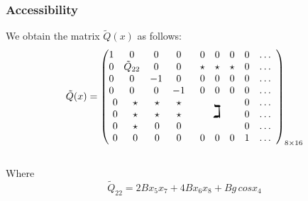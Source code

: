 \begin{frame}
\frametitle{Accessibility}
We obtain the matrix $\tilde{Q}(x)$ as follows:\\[10pt]
\begin{equation}
	\tilde{Q}(x)=%
	\begin{pmatrix}
		\begin{matrix}
		1 &0     &0     &0 \\
		0 &\tilde{Q}_{22} &0     &0 \\
		0 &0     &-1    &0 \\
		0 &0     &0     &-1
		\end{matrix}
		&\begin{matrix}
		0     &0     &0     &0 &\dots \\
		\star &\star &\star &0 &\dots \\
		0     &0     &0     &0 &\dots \\
		0     &0     &0     &0  &\dots
		\end{matrix}\\
		\begingroup %
		\setlength\arraycolsep{8.5pt}
		\begin{matrix}
		0 \!&\star &\star &\star \\
		0 \!&\star &\star &\star \\
		0 \!&\star &0     &0     \\
		0 \!&0     &0     &0
		\end{matrix}
		\endgroup
		&\begin{array}{cr}
			\mbox{\LARGE $\gimel$}
			&\begin{matrix}
			0 &\dots \\
			0 &\dots \\
			0 &\dots
			\end{matrix}\\
			\begin{matrix}
			0 &0 &0
			\end{matrix}
			&\begin{matrix}
			1 &\dots
			\end{matrix}
		\end{array}
	\end{pmatrix}_{8\times16}
\end{equation}\\[8pt]
Where \[\tilde{Q}_{22} = 2Bx_5x_7 + 4Bx_6x_8 + Bg\,cosx_4\]
\end{frame}
%
